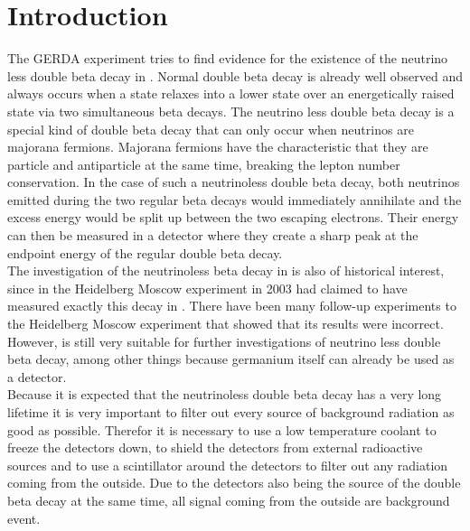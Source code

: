 





\chapter{Introduction}
\label{sec:intro}

The GERDA experiment tries to find evidence for the existence of the neutrino less double beta decay in .
Normal double beta decay is already well observed and always occurs when a state relaxes into a lower state over an energetically raised state via two simultaneous beta decays.
The neutrino less double beta decay is a special kind of double beta decay that can only occur when neutrinos are majorana fermions.
Majorana fermions have the characteristic that they are particle and antiparticle at the same time, breaking the lepton number conservation.
In the case of such a neutrinoless double beta decay, both neutrinos emitted during the two regular beta decays would immediately annihilate and the excess energy would be split up between the two escaping electrons.
Their energy can then be measured in a detector where they create a sharp peak at the endpoint energy of the regular double beta decay.
\\

The investigation of the neutrinoless beta decay in \Ge is also of historical interest, since in the Heidelberg Moscow experiment in 2003 had claimed to have measured exactly this decay in \Ge.
There have been many follow-up experiments to the Heidelberg Moscow experiment that showed that its results were incorrect.
However, \Ge is still very suitable for further investigations of neutrino less double beta decay, among other things because germanium itself can already be used as a detector.
\\

Because it is expected that the neutrinoless double beta decay has a very long lifetime it is very important to filter out every source of background radiation as good as possible. 
Therefor it is necessary to use a low temperature coolant to freeze the  detectors down, to shield the detectors from external radioactive sources and to use a scintillator around the detectors to filter out any radiation coming from the outside. 
Due to the \Ge detectors also being the source of the double beta decay at the same time, all signal coming from the outside are background event. 
\\

